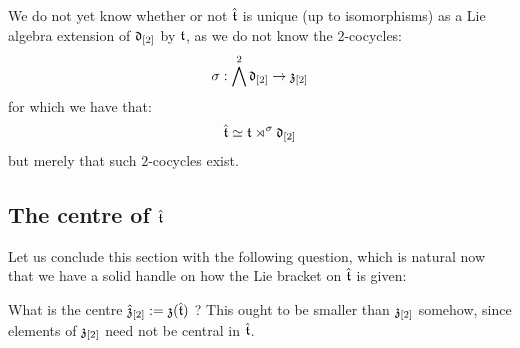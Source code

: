         \begin{remark}
            We do not yet know whether or not $\hat{\mathfrak{t}}$ is unique (up to isomorphisms) as a Lie algebra extension of $\mathfrak{d}_{[2]}$ by $\mathfrak{t}$, as we do not know the $2$-cocycles:
                $$\sigma: \bigwedge^2 \mathfrak{d}_{[2]} \to \mathfrak{z}_{[2]}$$
            for which we have that:
                $$\hat{\mathfrak{t}} \simeq \mathfrak{t} \rtimes^{\sigma} \mathfrak{d}_{[2]}$$
            but merely that such $2$-cocycles exist. 
        \end{remark}

    \subsection{The centre of \texorpdfstring{$\hat{\mathfrak{t}}$}{}}
        Let us conclude this section with the following question, which is natural now that we have a solid handle on how the Lie bracket on $\hat{\mathfrak{t}}$ is given:
        \begin{question}
            What is the centre $\hat{\mathfrak{z}}_{[2]} := \mathfrak{z}( \hat{\mathfrak{t}} )$ ? This ought to be smaller than $\mathfrak{z}_{[2]}$ somehow, since elements of $\mathfrak{z}_{[2]}$ need not be central in $\hat{\mathfrak{t}}$. 
        \end{question}
